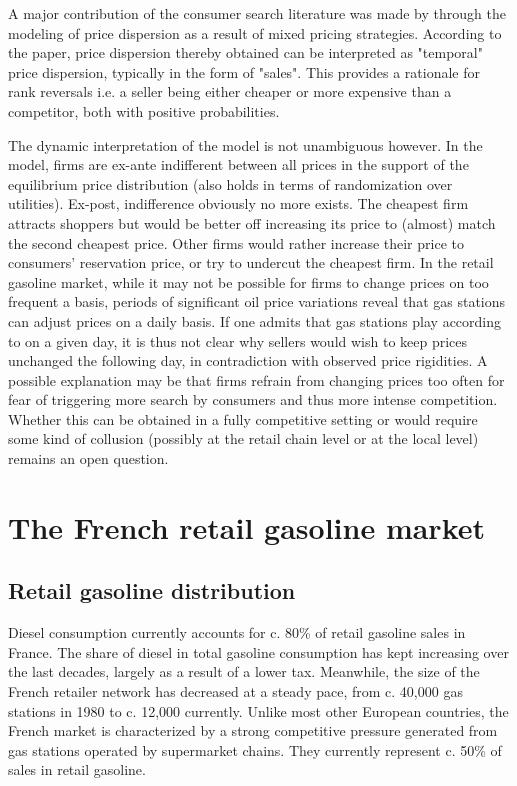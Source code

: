 \documentclass[english]{article}
\begin{document}
A major contribution of the consumer search literature was made by \cite{VAR80} through the modeling of price dispersion as a result of mixed pricing strategies. According to the paper, price dispersion thereby obtained can be interpreted as "temporal" price dispersion, typically in the form of "sales". This provides a rationale for rank reversals i.e. a seller being either cheaper or more expensive than a competitor, both with positive probabilities.

The dynamic interpretation of the model is not unambiguous however. In the model, firms are ex-ante indifferent between all prices in the support of the equilibrium price distribution (also holds in terms of randomization over utilities). Ex-post, indifference obviously no more exists. The cheapest firm attracts shoppers but would be better off increasing its price to (almost) match the second cheapest price. Other firms would rather increase their price to consumers' reservation price, or try to undercut the cheapest firm. In the retail gasoline market, while it may not be possible for firms to change prices on too frequent a basis, periods of significant oil price variations reveal that gas stations can adjust prices on a daily basis. If one admits that gas stations play according to \cite{VAR80} on a given day, it is thus not clear why sellers would wish to keep prices unchanged the following day, in contradiction with observed price rigidities. A possible explanation may be that firms refrain from changing prices too often for fear of triggering more search by consumers and thus more intense competition. Whether this can be obtained in a fully competitive setting  or would require some kind of collusion (possibly at the retail chain level or at the local level) remains an open question.

\section{The French retail gasoline market}

\subsection{Retail gasoline distribution}

Diesel consumption currently accounts for c. 80\% of retail gasoline sales in France. The share of diesel in total gasoline consumption has kept increasing over the last decades, largely as a result of a lower tax. Meanwhile, the size of the French retailer network has decreased at a steady pace, from c. 40,000 gas stations in 1980 to c. 12,000 currently.  Unlike most other European countries, the French market is characterized by a strong competitive pressure generated from gas stations operated by supermarket chains. They currently represent c. 50\% of sales in retail gasoline.
\end{document}
